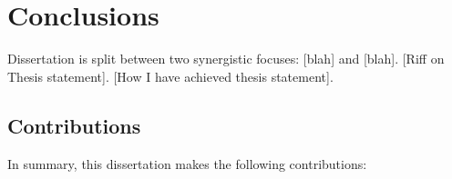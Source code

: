 \chapter{Conclusions}
\label{chapter:conclusions}




Dissertation is split between two synergistic focuses: [blah] and [blah].
[Riff on Thesis statement].
[How I have achieved thesis statement].

\section{Contributions}

In summary, this dissertation makes the following contributions:

